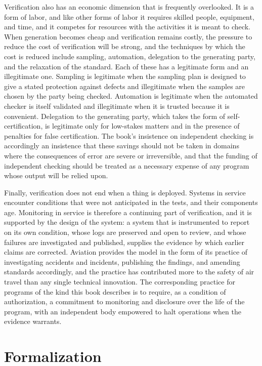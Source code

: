 Verification also has an economic dimension that is frequently overlooked. It is a form of labor, and like other forms of labor it requires skilled people, equipment, and time, and it competes for resources with the activities it is meant to check. When generation becomes cheap and verification remains costly, the pressure to reduce the cost of verification will be strong, and the techniques by which the cost is reduced include sampling, automation, delegation to the generating party, and the relaxation of the standard. Each of these has a legitimate form and an illegitimate one. Sampling is legitimate when the sampling plan is designed to give a stated protection against defects and illegitimate when the samples are chosen by the party being checked. Automation is legitimate when the automated checker is itself validated and illegitimate when it is trusted because it is convenient. Delegation to the generating party, which takes the form of self-certification, is legitimate only for low-stakes matters and in the presence of penalties for false certification. The book's insistence on independent checking is accordingly an insistence that these savings should not be taken in domains where the consequences of error are severe or irreversible, and that the funding of independent checking should be treated as a necessary expense of any program whose output will be relied upon.

Finally, verification does not end when a thing is deployed. Systems in service encounter conditions that were not anticipated in the tests, and their components age. Monitoring in service is therefore a continuing part of verification, and it is supported by the design of the system: a system that is instrumented to report on its own condition, whose logs are preserved and open to review, and whose failures are investigated and published, supplies the evidence by which earlier claims are corrected. Aviation provides the model in the form of its practice of investigating accidents and incidents, publishing the findings, and amending standards accordingly, and the practice has contributed more to the safety of air travel than any single technical innovation. The corresponding practice for programs of the kind this book describes is to require, as a condition of authorization, a commitment to monitoring and disclosure over the life of the program, with an independent body empowered to halt operations when the evidence warrants.

\section*{Formalization}

